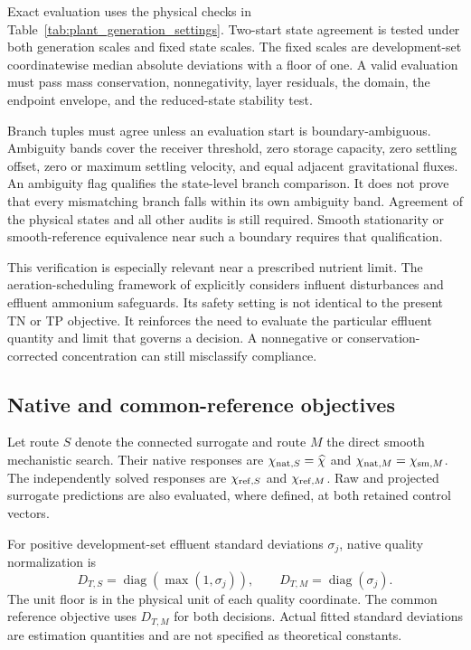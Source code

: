 Exact evaluation uses the physical checks in Table~\ref{tab:plant_generation_settings}. Two-start state agreement is tested under both generation scales and fixed state scales. The fixed scales are development-set coordinatewise median absolute deviations with a floor of one. A valid evaluation must pass mass conservation, nonnegativity, layer residuals, the domain, the endpoint envelope, and the reduced-state stability test.

Branch tuples must agree unless an evaluation start is boundary-ambiguous. Ambiguity bands cover the receiver threshold, zero storage capacity, zero settling offset, zero or maximum settling velocity, and equal adjacent gravitational fluxes. An ambiguity flag qualifies the state-level branch comparison. It does not prove that every mismatching branch falls within its own ambiguity band. Agreement of the physical states and all other audits is still required. Smooth stationarity or smooth-reference equivalence near such a boundary requires that qualification.

This verification is especially relevant near a prescribed nutrient limit. The aeration-scheduling framework of \citet{Ren2026} explicitly considers influent disturbances and effluent ammonium safeguards. Its safety setting is not identical to the present TN or TP objective. It reinforces the need to evaluate the particular effluent quantity and limit that governs a decision. A nonnegative or conservation-corrected concentration can still misclassify compliance.

\subsection{Native and common-reference objectives}

Let route $S$ denote the connected surrogate and route $M$ the direct smooth mechanistic search. Their native responses are $\chi_{{\rm nat},S}=\widehat\chi$ and $\chi_{{\rm nat},M}=\chi_{{\rm sm},M}$. The independently solved responses are $\chi_{{\rm ref},S}$ and $\chi_{{\rm ref},M}$. Raw and projected surrogate predictions are also evaluated, where defined, at both retained control vectors.

For positive development-set effluent standard deviations $\sigma_j$, native quality normalization is
\begin{equation}
D_{T,S}=\operatorname{diag}(\max(1,\sigma_j)),\qquad
D_{T,M}=\operatorname{diag}(\sigma_j).
\label{eq:plant_route_normalization}
\end{equation}
The unit floor is in the physical unit of each quality coordinate. The common reference objective uses $D_{T,M}$ for both decisions. Actual fitted standard deviations are estimation quantities and are not specified as theoretical constants.

